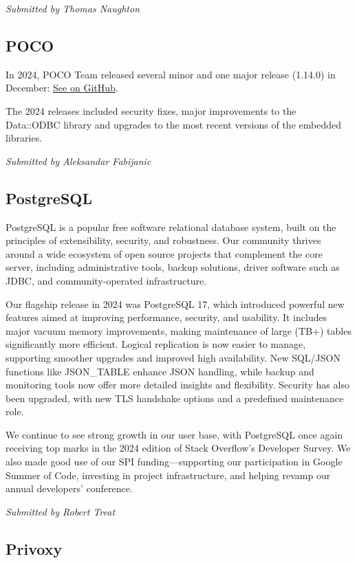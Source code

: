 \documentclass[a4paper]{report}
\begin{document}
{\em Submitted by Thomas Naughton}

\subsection{POCO}

In 2024, POCO Team released several minor and one major release (1.14.0) in December: \href{https://github.com/pocoproject/poco/releases/tag/poco-1.14.0-release}{See on GitHub}.

The 2024 releases included security fixes, major improvements to the Data::ODBC library and upgrades to the most recent versions of the embedded libraries.

{\em Submitted by Aleksandar Fabijanic}

\subsection{PostgreSQL}

PostgreSQL is a popular free software relational database system, built on the principles of extensibility, security, and robustness. Our community thrives around a wide ecosystem of open source projects that complement the core server, including administrative tools, backup solutions, driver software such as JDBC, and community-operated infrastructure.

Our flagship release in 2024 was PostgreSQL 17, which introduced powerful new features aimed at improving performance, security, and usability. It includes major vacuum memory improvements, making maintenance of large (TB+) tables significantly more efficient. Logical replication is now easier to manage, supporting smoother upgrades and improved high availability. New SQL/JSON functions like JSON\_TABLE enhance JSON handling, while backup and monitoring tools now offer more detailed insights and flexibility. Security has also been upgraded, with new TLS handshake options and a predefined maintenance role.

We continue to see strong growth in our user base, with PostgreSQL once again receiving top marks in the 2024 edition of Stack Overflow’s Developer Survey. We also made good use of our SPI funding—supporting our participation in Google Summer of Code, investing in project infrastructure, and helping revamp our annual developers’ conference.

{\em Submitted by Robert Treat}

\subsection{Privoxy}
\end{document}
